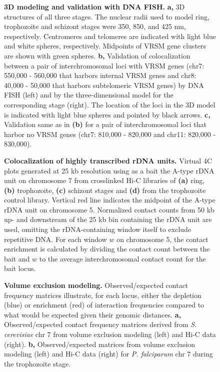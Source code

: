 \begin{figure}[h]
\centering
\caption{{\bf 3D modeling and validation with DNA FISH.}
 \textbf{a,} 3D structures of all three stages. The nuclear radii used to
 model ring, trophozoite and schizont stages were 350, 850, and 425 nm,
 respectively. Centromeres and telomeres are indicated with light blue and
 white spheres, respectively. Midpoints of VRSM gene clusters are shown with
 green spheres. \textbf{b,} Validation of colocalization between a pair of
 interchromosomal loci with VRSM genes (chr7: 550,000 - 560,000 that harbors
 internal VRSM genes and chr8: 40,000 - 50,000 that harbors subtelomeric VRSM
 genes) by DNA FISH (left) and by the three-dimensional model for the
 corresponding stage (right). The location of the loci in the 3D model is
 indicated with light blue spheres and pointed by black arrows. \textbf{c,}
 Validation same as in \textbf{(b)} for a pair of interchromosomal loci that
 harbor no VRSM genes (chr7: 810,000 - 820,000 and chr11: 820,000 - 830,000).
 }
 \label{fig:fig2}
 \end{figure}


 
 \begin{figure}[h]
 \centering
 \caption{{\bf Colocalization of highly transcribed rDNA units.} 
  Virtual 4C plots generated at 25 kb resolution using as a bait the A-type
  rDNA unit on chromosome 7 from crosslinked Hi-C libraries of \textbf{(a)}
  ring, \textbf{(b)} trophozoite, \textbf{(c)} schizont stages and
  \textbf{(d)} from the trophozoite control library. Vertical red line
  indicates the midpoint of the A-type rDNA unit on chromosome 5. Normalized
  contact counts from 50 kb up- and downstream of the 25 kb bin containing the
  rDNA unit are used, omitting the rDNA-containing window itself to exclude
  repetitive DNA. For each window $w$ on chromosome 5, the contact enrichment
  is calculated by dividing the contact count between the bait and $w$ to the
  average interchromosomal contact count for the bait locus.
  }
  \label{fig:fig3}
  \end{figure}

  \begin{figure}[h]
  \centering
  \caption{{\bf Volume exclusion modeling. }
  Observed/expected contact frequency matrices illustrate, for each locus,
  either the depletion (blue) or enrichment (red) of interaction frequencies
  compared to what would be expected given their genomic distances.
  \textbf{a,} Observed/expected contact frequency matrices derived from {\em
  S. cerevisiae} chr 7 from volume exclusion modeling (left) and Hi-C data
  (right). \textbf{b,} Observed/expected matrices from volume exclusion
  modeling (left) and Hi-C data (right) for {\em P. falciparum} chr 7 during
  the trophozoite stage.}
  \label{fig:fig4}
  \end{figure}



